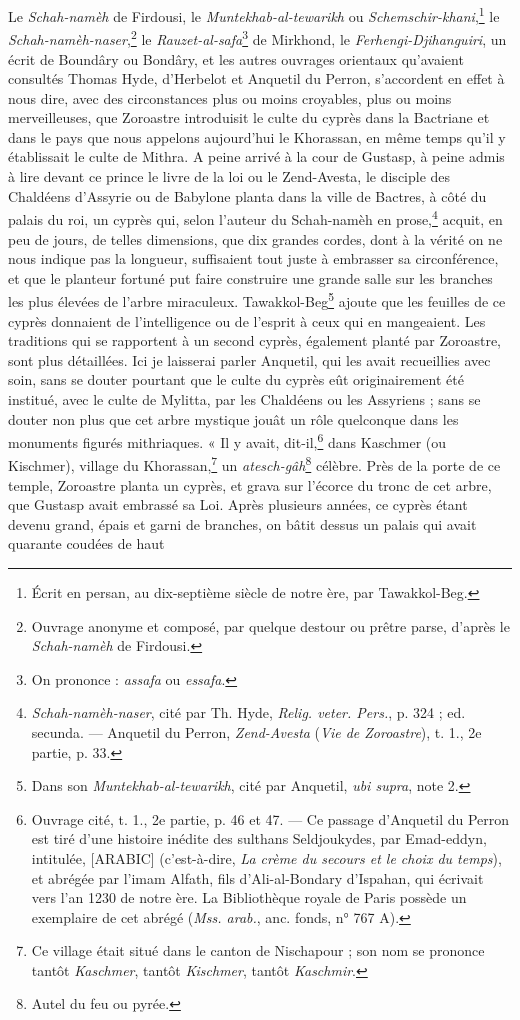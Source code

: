 \documentclass[a4paper, 11pt, oneside, polutonikogreek, french]{article}
\begin{document}
Le \emph{Schah-namèh} de Firdousi, le \emph{Muntekhab-al-tewarikh} ou \emph{Schemschir-khani},\footnote{Écrit en persan, au dix-septième siècle de notre ère, par Tawakkol-Beg.} le \emph{Schah-namèh-naser},\footnote{Ouvrage anonyme et composé, par quelque destour ou prêtre parse, d'après le \emph{Schah-namèh} de Firdousi.} le \emph{Rauzet-al-safa}\footnote{On prononce : \emph{assafa} ou \emph{essafa}.} de Mirkhond, le \emph{Ferhengi-Djihanguiri}, un écrit de Boundâry ou Bondâry, et les autres ouvrages orientaux qu'avaient consultés Thomas Hyde, d'Herbelot et Anquetil du Perron, s'accordent en effet à nous dire, avec des circonstances plus ou moins croyables, plus ou moins merveilleuses, que Zoroastre introduisit le culte du cyprès dans la Bactriane et dans le pays que nous appelons aujourd'hui le Khorassan, en même temps qu'il y établissait le culte de Mithra. A peine arrivé à la cour de Gustasp, à peine admis à lire devant ce prince le livre de la loi ou le Zend-Avesta, le disciple des Chaldéens d'Assyrie ou de Babylone planta dans la ville de Bactres, à côté du palais du roi, un cyprès qui, selon l'auteur du Schah-namèh en prose,\footnote{\emph{Schah-namèh-naser}, cité par Th. Hyde, \emph{Relig. veter. Pers.}, p. 324 ; ed. secunda. --- Anquetil du Perron, \emph{Zend-Avesta} (\emph{Vie de Zoroastre}), t. 1., 2e partie, p. 33.} acquit, en peu de jours, de telles dimensions, que dix grandes cordes, dont à la vérité on ne nous indique pas la longueur, suffisaient tout juste à embrasser sa circonférence, et que le planteur fortuné put faire construire une grande salle sur les branches les plus élevées de l'arbre miraculeux. Tawakkol-Beg\footnote{Dans son \emph{Muntekhab-al-tewarikh}, cité par Anquetil, \emph{ubi supra}, note 2.} ajoute que les feuilles de ce cyprès donnaient de l'intelligence ou de l'esprit à ceux qui en mangeaient. Les traditions qui se rapportent à un second cyprès, également planté par Zoroastre, sont plus détaillées. Ici je laisserai parler Anquetil, qui les avait recueillies avec soin, sans se douter pourtant que le culte du cyprès eût originairement été institué, avec le culte de Mylitta, par les Chaldéens ou les Assyriens ; sans se douter non plus que cet arbre mystique jouât un rôle quelconque dans les monuments figurés mithriaques. « Il y avait, dit-il,\footnote{Ouvrage cité, t. 1., 2e partie, p. 46 et 47. --- Ce passage d'Anquetil du Perron est tiré d'une histoire inédite des sulthans Seldjoukydes, par Emad-eddyn, intitulée, [ARABIC] (c'est-à-dire, \emph{La crème du secours et le choix du temps}), et abrégée par l'imam Alfath, fils d'Ali-al-Bondary d'Ispahan, qui écrivait vers l'an 1230 de notre ère. La Bibliothèque royale de Paris possède un exemplaire de cet abrégé (\emph{Mss. arab.}, anc. fonds, n° 767 A).} dans Kaschmer (ou Kischmer), village du Khorassan,\footnote{Ce village était situé dans le canton de Nischapour ; son nom se prononce tantôt \emph{Kaschmer}, tantôt \emph{Kischmer}, tantôt \emph{Kaschmir}.} un \emph{atesch-gâh}\footnote{Autel du feu ou pyrée.} célèbre. Près de la porte de ce temple, Zoroastre planta un cyprès, et grava sur l'écorce du tronc de cet arbre, que Gustasp avait embrassé sa Loi. Après plusieurs années, ce cyprès étant devenu grand, épais et garni de branches, on bâtit dessus un palais qui avait quarante coudées de haut 
\end{document}
